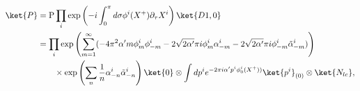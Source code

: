 \begin{equation}
\begin{split}
 \ket{P}&= \mbox{P}\prod_i \exp \left( 
   - i \int^{\pi}_0 d \sigma \phi^i (X^+) \partial_{\tau} X^i \right) 
         \ket{D1,0} \\ & =  \prod_i
  \exp \left( \sum_{m=1}^{\infty} (- 4 \pi^2 \alpha' m \phi^i_m \phi^i_{-m} 
              - 2 \sqrt{2 \alpha'} \pi i \phi_m^i \alpha^i_{-m}
              - 2 \sqrt{2 \alpha'} \pi i \phi_{-m}^i \tilde
 \alpha^i_{-m})\right) \\ & \qquad \times
 \exp\left( \sum_n \frac1n \alpha^i_{-n} \tilde
 \alpha^i_{-n}\right) \ket{0} \otimes 
  \int d p^i e^{-  2 \pi i \alpha' p^i \phi^i_0
 (X^+))} \ket{p^i}_{(0)} \otimes \ket{N_{lc}} ,
\end{split}
\end{equation}

